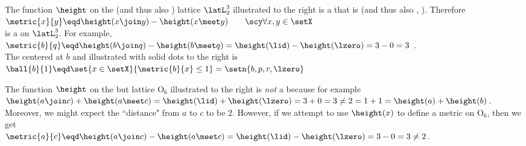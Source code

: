 \begin{minipage}{\tw-50mm}
\begin{example}
    The function $\height$ on the  (and thus also ) lattice $\latL_2^3$ 
    illustrated to the right is a  
    that is  (and thus also , ). Therefore
    \\\indentx$\metric{x}{y}\eqd\height(x\join y)-\height(x\meet y)\qquad{\scy\forall x,y\in\setX}$\\
    is a   on $\latL_2^3$.
    For example, 
    \\\indentx$\metric{b}{q} \eqd \height(b\join q)-\height(b\meet q) = \height(\lid)-\height(\lzero)=3-0=3$ .\\
    The  centered at $b$  and illustrated with solid dots to the right is 
    \\\indentx$\ball{b}{1}\eqd\set{x\in\setX}{\metric{b}{x}\le1}=\setn{b,p,r,\lzero}$\\
\end{example}%
\end{minipage}%
\hfill{}%

\begin{minipage}{\tw-50mm}
  \begin{example}
  The  function $\height$  
  on the  but  lattice O$_6$ illustrated to the right 
  is \emph{not} a  because for example
  \\\indentx$\height(a\join c)+\height(a\meet c) = \height(\lid)+\height(\lzero) = 3+0=3
        \neq 2 = 1 + 1 = \height(a) + \height(b)$.\\
  Moreover, we might expect the ``distance" from $a$ to $c$ to be $2$. 
  However, if we attempt to use $\height(x)$ to define a metric on O$_6$, then we get
  \\\indentx$\metric{a}{c}\eqd\height(a\join c)-\height(a\meet c)=\height(\lid)-\height(\lzero)=3-0=3\neq2$.
\end{example}
\end{minipage}
\hfill{}%


